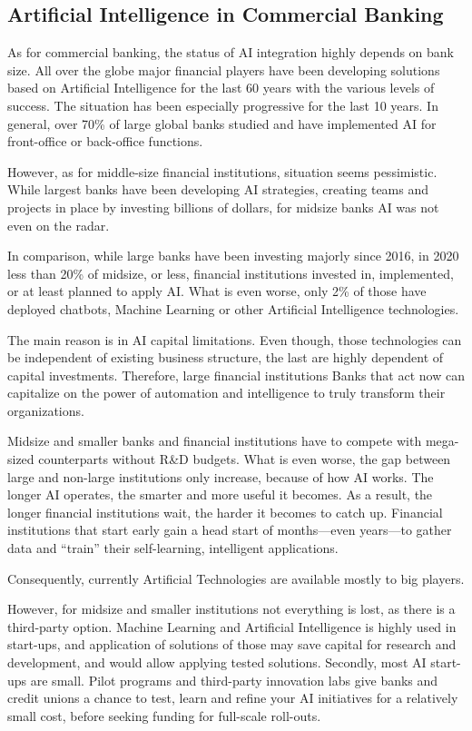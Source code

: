 \subsection{Artificial Intelligence in Commercial Banking}

As for commercial banking, the status of AI integration highly depends on bank size.
All over the globe major financial players have been developing solutions based on Artificial Intelligence for the last 60 years with the various levels of success.
The situation has been especially progressive for the last 10 years.
In general, over 70\% of large global banks studied and have implemented AI for front-office or back-office functions.
\cite{deloitte_thriving_in_ai_era}

However, as for middle-size financial institutions, situation seems pessimistic.
While largest banks have been developing AI strategies, creating teams and projects in place by investing billions of dollars, for midsize banks AI was not even on the radar.

In comparison, while large banks have been investing majorly since 2016, in 2020 less than 20\% of midsize, or less, financial institutions invested in, implemented, or at least planned to apply AI.
What is even worse, only 2\% of those have deployed chatbots, Machine Learning or other Artificial Intelligence technologies.
\cite{ai_transform_disrupt}

The main reason is in AI capital limitations.
Even though, those technologies can be independent of existing business structure, the last are highly dependent of capital investments.
Therefore, large financial institutions Banks that act now can capitalize on the power of automation and intelligence to truly transform their organizations.


Midsize and smaller banks and financial institutions have to compete with mega-sized counterparts without R\&D budgets.
What is even worse, the gap between large and non-large institutions only increase, because of how AI works.
The longer AI operates, the smarter and more useful it becomes.
As a result, the longer financial institutions wait, the harder it becomes to catch up. 
Financial institutions that start early gain a head start of months—even years—to gather data and “train” their self-learning, intelligent applications. 


Consequently, currently Artificial Technologies are available mostly to big players.

However, for midsize and smaller institutions not everything is lost, as there is a third-party option.
Machine Learning and Artificial Intelligence is highly used in start-ups, and application of solutions of those may save capital for research and development, and would allow applying tested solutions.
Secondly, most AI start-ups are small. 
Pilot programs and third-party innovation labs give banks and credit unions a chance to test, learn and refine your AI initiatives for a relatively small cost, before seeking funding for full-scale roll-outs.


